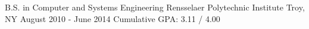 \begin{cventries}
  \cventry
    {B.S. in Computer and Systems Engineering}
    {Rensselaer Polytechnic Institute}
    {Troy, NY}
    {August 2010 - June 2014}
    {Cumulative GPA: 3.11 / 4.00}
\end{cventries}
